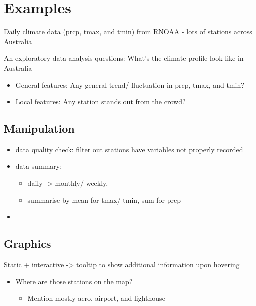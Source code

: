 \documentclass{article}
\begin{document}
\hypertarget{examples}{%
\section{Examples}\label{examples}}

Daily climate data (prcp, tmax, and tmin) from RNOAA - lots of stations
across Australia

An exploratory data analysis questions: What's the climate profile look
like in Australia

\begin{itemize}
\tightlist
\item
  General features: Any general trend/ fluctuation in prcp, tmax, and
  tmin?
\item
  Local features: Any station stands out from the crowd?
\end{itemize}

\hypertarget{manipulation}{%
\subsection{Manipulation}\label{manipulation}}

\begin{itemize}
\tightlist
\item
  data quality check: filter out stations have variables not properly
  recorded
\item
  data summary:

  \begin{itemize}
  \tightlist
  \item
    daily -\textgreater{} monthly/ weekly,
  \item
    summarise by mean for tmax/ tmin, sum for prcp
  \end{itemize}
\item
\end{itemize}

\hypertarget{graphics}{%
\subsection{Graphics}\label{graphics}}

Static + interactive -\textgreater{} tooltip to show additional
information upon hovering

\begin{itemize}
\tightlist
\item
  Where are those stations on the map?

  \begin{itemize}
  \tightlist
  \item
    Mention mostly aero, airport, and lighthouse
  \end{itemize}
\end{itemize}
\end{document}
